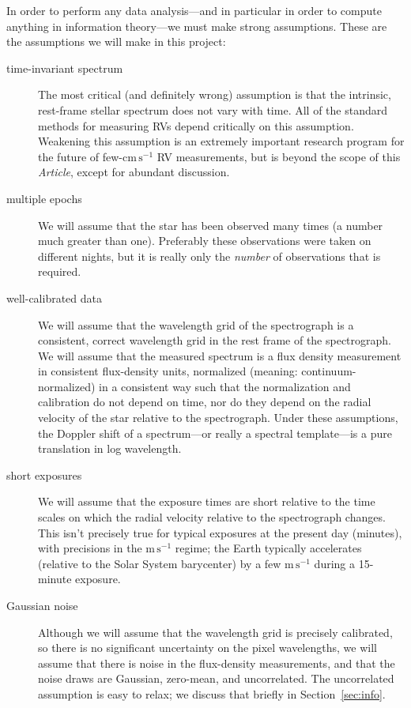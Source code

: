 \documentclass[modern]{aastex631}
\newcommand{\unit}[1]{\mathrm{#1}}
\newcommand{\m}{\unit{m}}
\newcommand{\cm}{\unit{cm}}
\newcommand{\s}{\unit{s}}
\newcommand{\cmps}{\cm\,\s^{-1}}
\newcommand{\mps}{\m\,\s^{-1}}
\newcommand{\documentname}{\textsl{Article}}
\newcommand{\sectionname}{Section}
\newcommand{\secref}[1]{\sectionname~\ref{#1}}
\begin{document}
In order to perform any data analysis---and in particular in order to compute anything in information theory---we must make strong assumptions.
These are the assumptions we will make in this project:
\begin{description}
    \item[time-invariant spectrum]
    The most critical (and definitely wrong) assumption is that the intrinsic, rest-frame stellar spectrum does not vary with time.
    All of the standard methods for measuring RVs depend critically on this assumption.
    Weakening this assumption is an extremely important research program for the future of few-$\cmps$ RV measurements, but is beyond the scope of this \documentname, except for abundant discussion.
    \item[multiple epochs]
    We will assume that the star has been observed many times (a number much greater than one). Preferably these observations were taken on different nights, but it is really only the \emph{number} of observations that is required.
    \item[well-calibrated data]
    We will assume that the wavelength grid of the spectrograph is a consistent, correct wavelength grid in the rest frame of the spectrograph.
    We will assume that the measured spectrum is a flux density measurement in consistent flux-density units, normalized (meaning: continuum-normalized) in a consistent way such that the normalization and calibration do not depend on time, nor do they depend on the radial velocity of the star relative to the spectrograph.
    Under these assumptions, the Doppler shift of a spectrum---or really a spectral template---is a pure translation in log wavelength. 
    \item[short exposures]
    We will assume that the exposure times are short relative to the time scales on which the radial velocity relative to the spectrograph changes.
    This isn't precisely true for typical exposures at the present day (minutes), with precisions in the $\mps$ regime; the Earth typically accelerates (relative to the Solar System barycenter) by a few $\mps$ during a 15-minute exposure.
    \item[Gaussian noise]
    Although we will assume that the wavelength grid is precisely calibrated, so there is no significant uncertainty on the pixel wavelengths, we will assume that there is noise in the flux-density measurements, and that the noise draws are Gaussian, zero-mean, and uncorrelated.
    The uncorrelated assumption is easy to relax; we discuss that briefly in \secref{sec:info}.

\end{description}
\end{document}
